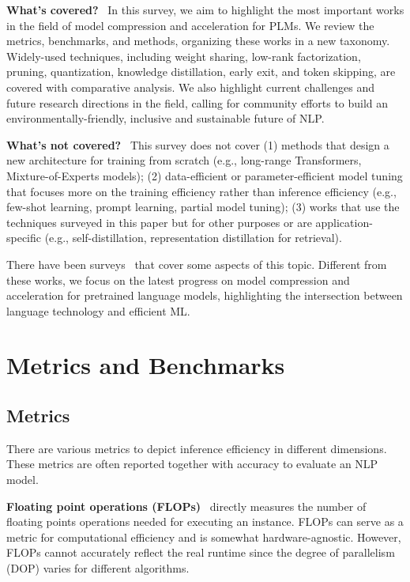 \documentclass[letterpaper]{article} %
\newcommand{\eg}{e.g.,\xspace}
\newcommand{\paratitle}[1]{\noindent\textbf{#1}\ }
\begin{document}
\paratitle{What's covered?} In this survey, we aim to highlight the most important works in the field of model compression and acceleration for PLMs. We review the metrics, benchmarks, and methods, organizing these works in a new taxonomy. Widely-used techniques, including weight sharing, low-rank factorization, pruning, quantization, knowledge distillation, early exit, and token skipping, are covered with comparative analysis. We also highlight current challenges and future research directions in the field, calling for community efforts to build an environmentally-friendly, inclusive and sustainable future of NLP.

\paratitle{What's not covered?} This survey does not cover (1) methods that design a new architecture for training from scratch (\eg long-range Transformers, Mixture-of-Experts models); (2) data-efficient or parameter-efficient model tuning that focuses more on the training efficiency rather than inference efficiency (\eg few-shot learning, prompt learning, partial model tuning); (3) works that use the techniques surveyed in this paper but for other purposes or are application-specific (\eg self-distillation, representation distillation for retrieval).

There have been surveys~\citep{qiu2020pre,han2021pre,xu2021survey} that cover some aspects of this topic. Different from these works, we focus on the latest progress on model compression and acceleration for pretrained language models, highlighting the intersection between language technology and efficient ML.




\section{Metrics and Benchmarks}

\subsection{Metrics}
\label{sec:metrics}

There are various metrics to depict inference efficiency in different dimensions. These metrics are often reported together with accuracy to evaluate an NLP model.


\paratitle{Floating point operations (FLOPs)} directly measures the number of floating points operations needed for executing an instance. FLOPs can serve as a metric for computational efficiency and is somewhat hardware-agnostic. However, FLOPs cannot accurately reflect the real runtime since the degree of parallelism (DOP) varies for different algorithms.
\end{document}
